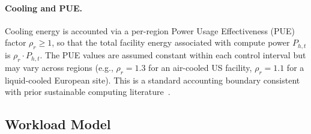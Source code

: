 \documentclass[a4paper,fleqn]{cas-dc}
\begin{document}
\paragraph{Cooling and PUE.}
Cooling energy is accounted via a per-region Power Usage Effectiveness (PUE) factor $\rho_r \geq 1$, so that the total facility energy associated with compute power $P_{h,t}$ is $\rho_r \cdot P_{h,t}$. The PUE values are assumed constant within each control interval but may vary across regions (e.g., $\rho_r = 1.3$ for an air-cooled US facility, $\rho_r = 1.1$ for a liquid-cooled European site). This is a standard accounting boundary consistent with prior sustainable computing literature~\cite{ref-banerjee11,ref-nadjahi18}.

\subsection{Workload Model}
\label{sec:workload}
\end{document}
